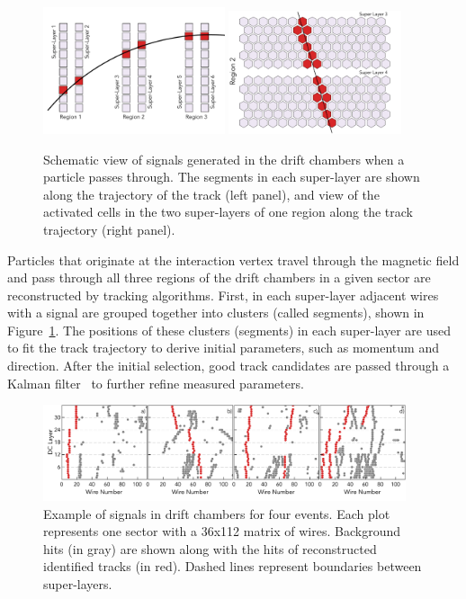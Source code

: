 \documentclass{webofc}
\begin{document}
\begin{figure}[!ht]
\begin{center}
 \includegraphics[width=2.1in]{images/dc_diagram.pdf}
 \includegraphics[width=2in]{images/region_2_diagram.pdf}
\caption {Schematic view of signals generated in the drift chambers when a particle passes through. 
The segments in each super-layer are shown along the trajectory of the track (left panel), and view 
of the activated cells in the two super-layers of one region along the track trajectory (right panel).}
 \label{dc:side_view}
 \end{center}
\end{figure}

Particles that originate at the interaction vertex travel through the magnetic field and pass through all 
three regions of the drift chambers in a given sector are reconstructed by tracking algorithms. First, 
in each super-layer adjacent wires with a signal are grouped together into clusters (called segments), 
shown in Figure~\ref{dc:side_view}. The positions of these clusters (segments) in each super-layer 
are used to fit the track trajectory to derive initial parameters, such as momentum and direction. 
After the initial selection, good track candidates are passed through a Kalman filter~\cite{Kalman1960} 
 to further refine measured parameters.

\begin{figure}[!ht]
\begin{center}
 \includegraphics[width=4.2in]{images/figure_dc_examples.pdf}
\caption {Example of signals in drift chambers for four events. Each plot represents one sector with a 
36x112 matrix of wires. Background hits (in gray) are shown along with the hits of reconstructed 
identified tracks (in red). Dashed lines represent boundaries between super-layers.}
 \label{dc:events_sector}
 \end{center}
\end{figure}
\end{document}
